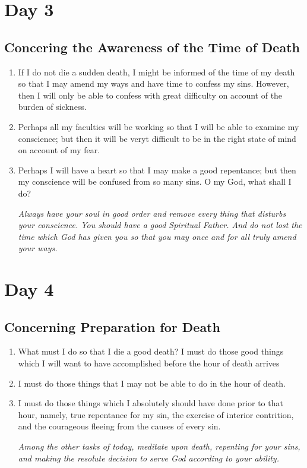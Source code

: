 \documentclass[11pt]{article}
\begin{document}
\section{Day 3}
\label{sec:orgbc47464}
\subsection{Concering the Awareness of the Time of Death}
\label{sec:org64f6f6a}
\begin{enumerate}
\item If I do not die a sudden death, I might be informed of the time of my death so that I may amend my ways and have time to confess my sins.
However, then I will only be able to confess with great difficulty on account of the burden of sickness.
\item Perhaps all my faculties will be working so that I will be able to examine my conscience; but then it will be veryt difficult to be in the
right state of mind on account of my fear.
\item Perhaps I will have a heart so that I may make a good repentance; but then my conscience will be confused from so many sins. O my God, what shall I do?

\emph{Always have your soul in good order and remove every thing that disturbs your conscience. You should have a good Spiritual Father. And do not lost the
time which God has given you so that you may once and for all truly amend your ways.}
\end{enumerate}
\section{Day 4}
\label{sec:orgf2da29c}
\subsection{Concerning Preparation for Death}
\label{sec:org6a9bf1b}
\begin{enumerate}
\item What must I do so that I die a good death? I must do those good things which I will want to have accomplished before the hour of death arrives
\item I must do those things that I may not be able to do in the hour of death.
\item I must do those things which I absolutely should have done prior to that hour, namely, true repentance for my sin, the exercise of interior contrition, and the courageous fleeing from the causes of every sin.

\emph{Among the other tasks of today, meditate upon death, repenting for your sins, and making the resolute decision to serve God according to your ability.}
\end{enumerate}
\end{document}
